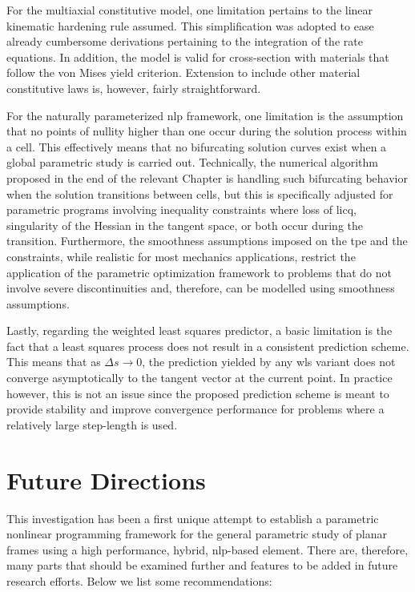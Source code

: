 For the multiaxial constitutive model, one limitation pertains to the linear 
kinematic 
hardening rule assumed. This simplification was adopted to ease already 
cumbersome 
derivations 
pertaining to the integration of the rate equations. In addition, the model is 
valid 
for cross-section with materials that follow the von Mises yield 
criterion. 
Extension to include other material constitutive laws is, however, fairly 
straightforward.

For the naturally parameterized \acrshort{nlp} framework, one limitation is the 
assumption that no points of nullity higher than one occur during the solution 
process 
within a cell. This effectively means that no bifurcating solution curves exist 
when a 
global parametric study is carried out. Technically, the numerical algorithm 
proposed 
in the end of the relevant Chapter is handling such bifurcating behavior when 
the 
solution transitions between cells, but this is specifically adjusted for 
parametric 
programs involving inequality constraints where loss of \acrshort{licq}, 
singularity 
of the Hessian in the tangent space, or both occur during the transition. 
Furthermore, 
the smoothness assumptions imposed on the \acrshort{tpe} and the constraints, 
while 
realistic for most mechanics applications, restrict the application of the 
parametric optimization framework to problems that do not involve severe 
discontinuities and, therefore, can be modelled using smoothness assumptions.

Lastly, regarding the weighted least squares predictor, a basic limitation is 
the fact 
that a least squares process does not result in a consistent prediction scheme. 
This 
means that as $\Delta s\rightarrow 0$, the prediction yielded by any 
\acrshort{wls} 
variant does not converge asymptotically to the tangent vector at the current 
point. 
In practice however, this is not an issue since the proposed prediction scheme 
is 
meant to provide stability and improve convergence performance for problems 
where a 
relatively large step-length is used. 


\section{Future Directions}
This investigation has been a first unique attempt to establish a parametric 
nonlinear 
programming framework for the general parametric study of planar frames using a 
high 
performance, hybrid, \acrshort{nlp}-based element. There are, therefore, many 
parts 
that should be examined further and features to be added in future research 
efforts. 
Below we list some recommendations:

